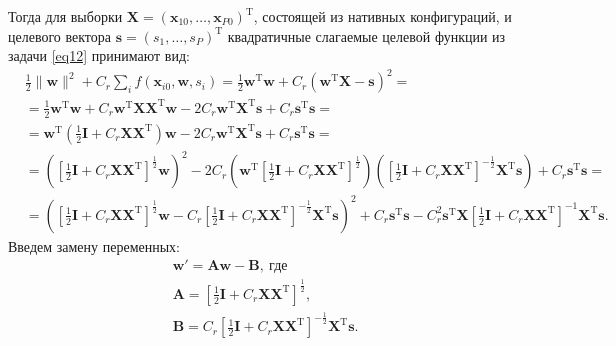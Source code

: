 \documentclass[12pt,twoside]{article}
\begin{document}
Тогда для выборки ${\mathbf{X}}=({\mathbf{x}}_{10}, \dots, {\mathbf{x}}_{P0})^{\text{T}}$, состоящей из нативных конфигураций, и целевого вектора  $\mathbf{s}=(s_1,\dots,s_P)^{\text{T}}$ квадратичные слагаемые целевой функции из задачи \eqref{eq12} принимают вид:
\begin{equation*}
\begin{aligned}
& \frac{1}{2} \|{\mathbf{w}}\|^2 + C_{r}\sum\limits_{i} f({\mathbf{x}}_{i0},{\mathbf{w}}, s_i)=\frac{1}{2}{\mathbf{w}}^{\text{T}}{\mathbf{w}}+C_{r}({\mathbf{w}}^{\text{T}}{\mathbf{X}} - \mathbf{s})^2 =\\
& = \frac{1}{2}{\mathbf{w}}^{\text{T}}{\mathbf{w}}+ C_{r}{\mathbf{w}}^{\text{T}}{\mathbf{X}}{\mathbf{X}}^{\text{T}}{\mathbf{w}}- 2C_{r}{\mathbf{w}}^{\text{T}}{\mathbf{X}}^{\text{T}}\mathbf{s} + C_{r}\mathbf{s}^{\text{T}}\mathbf{s}=\\
& = {\mathbf{w}}^{\text{T}}\left(\frac{1}{2}\mathbf{I} + C_{r}{\mathbf{X}}{\mathbf{X}}^{\text{T}}\right){\mathbf{w}}- 2C_{r}{\mathbf{w}}^{\text{T}}{\mathbf{X}}^{\text{T}}\mathbf{s}+ C_{r}\mathbf{s}^{\text{T}}\mathbf{s}=\\
& = \left(\left[\frac{1}{2}\mathbf{I} + C_{r}{\mathbf{X}}{\mathbf{X}}^{\text{T}}\right]^{\frac{1}{2}}{\mathbf{w}}\right)^2- 2C_{r}\left({\mathbf{w}}^{\text{T}}\left[\frac{1}{2}\mathbf{I} + C_{r}{\mathbf{X}}{\mathbf{X}}^{\text{T}}\right]^{\frac{1}{2}}\right)
\left(\left[\frac{1}{2}\mathbf{I} + C_{r}{\mathbf{X}}{\mathbf{X}}^{\text{T}}\right]^{-\frac{1}{2}}
{\mathbf{X}}^{\text{T}}\mathbf{s}\right)+ C_{r}\mathbf{s}^{\text{T}}\mathbf{s}=\\
& = \left(\left[\frac{1}{2}\mathbf{I} + C_{r}{\mathbf{X}}{\mathbf{X}}^{\text{T}}\right]^{\frac{1}{2}}{\mathbf{w}} - C_r\left[\frac{1}{2}\mathbf{I} + C_{r}{\mathbf{X}}{\mathbf{X}}^{\text{T}}\right]^{-\frac{1}{2}}
{\mathbf{X}}^{\text{T}}\mathbf{s}\right)^2 + C_r\mathbf{s}^{\text{T}}\mathbf{s}- C_r^2\mathbf{s}^{\text{T}}{\mathbf{X}}\left[\frac{1}{2}\mathbf{I} + C_{r}{\mathbf{X}}{\mathbf{X}}^{\text{T}}\right]^{-1}{\mathbf{X}}^{\text{T}}\mathbf{s}.
\end{aligned}
\end{equation*}
Введем замену переменных:
\begin{equation}\label{eq16}
\begin{aligned}
& \mathbf{w}'= \mathbf{A}{\mathbf{w}} - \mathbf{B}, \ \text{где} \\
& \mathbf{A}=\left[\frac{1}{2}\mathbf{I} + C_{r}{\mathbf{X}}{\mathbf{X}}^{\text{T}}\right]^{\frac{1}{2}},\\
& \mathbf{B}=C_r\left[\frac{1}{2}\mathbf{I} + C_{r}{\mathbf{X}}{\mathbf{X}}^{\text{T}}\right]^{-\frac{1}{2}}{\mathbf{X}}^{\text{T}}\mathbf{s}.
\end{aligned}
\end{equation}
\end{document}
